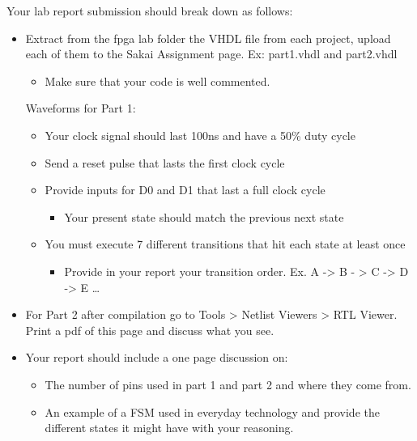 Your lab report submission should break down as follows:
\begin{itemize}

	\item Extract from the fpga lab folder the VHDL ﬁle from each project, upload each of them to the Sakai Assignment page. Ex: part1.vhdl and part2.vhdl
	\begin{itemize}
		\item Make sure that your code is well commented.
	\end{itemize}
	
	Waveforms for Part 1:
	\begin{itemize}
		\item Your clock signal should last 100ns and have a 50\% duty cycle
		
		\item Send a reset pulse that lasts the first clock cycle
		
		\item Provide inputs for D0 and D1 that last a full clock cycle
		\begin{itemize}
			\item Your present state should match the previous next state
		\end{itemize}
		
		\item You must execute 7 different transitions that hit each state at least once
		\begin{itemize}
			\item Provide in your report your transition order. Ex. A -> B - > C -> D -> E \dots
		\end{itemize}
	\end{itemize}
	
	\item For Part 2 after compilation go to Tools > Netlist Viewers > RTL Viewer. Print a pdf of this page and discuss what you see.
	
	\item Your report should include a one page discussion on:
	\begin{itemize}
		\item The number of pins used in part 1 and part 2 and where they come from.
		\item An example of a FSM used in everyday technology and provide the different states it might have with your reasoning.
	\end{itemize}
	
\end{itemize}


